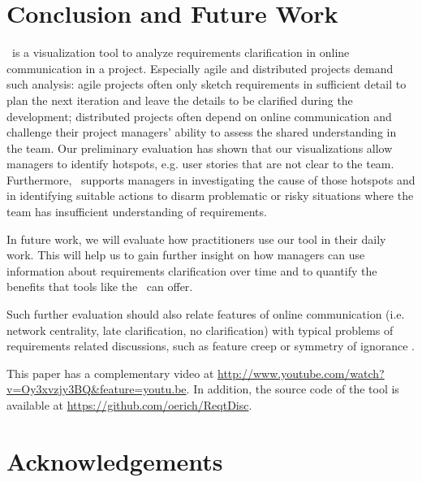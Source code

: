 \section{Conclusion and Future Work}
 \viss\ is a visualization tool to analyze requirements clarification in online communication in a project.
Especially agile and distributed projects demand such analysis: agile projects often only sketch requirements in sufficient detail to plan the next iteration and leave the details to be clarified during the development; distributed projects often depend on online communication and challenge their project managers' ability to assess the shared understanding in the team. 
Our preliminary evaluation has shown that our visualizations allow managers to identify hotspots, e.g. user stories that are not clear to the team. 
Furthermore, \viss\ supports managers in investigating the cause of those hotspots and in identifying suitable actions to disarm problematic or risky situations where the team has insufficient understanding of requirements.
 
In future work, we will evaluate how practitioners use our tool in their daily work. 
This will help us to gain further insight on how managers can use information about requirements clarification over time and to quantify the benefits that tools like the \viss\ can offer.

Such further evaluation should also relate features of online communication (i.e. network centrality, late clarification, no clarification) with typical problems of requirements related discussions, such as feature creep \cite{Jones1996} or symmetry of ignorance \cite{Fischer2000}.

This paper has a complementary video at \url{http://www.youtube.com/watch?v=Oy3xvzjy3BQ&feature=youtu.be}. In addition, the source code of the tool is available at \url{https://github.com/oerich/ReqtDisc}.
\section*{Acknowledgements}

